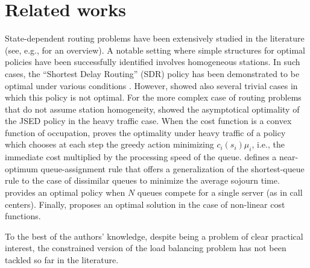 \section{Related works}
\label{sec:related works}

State-dependent routing problems have been extensively studied in the literature (see, e.g., \cite{argon2009dynamic} for an overview). A notable setting where simple structures for optimal policies have been successfully identified involves homogeneous stations. In such cases, the ``Shortest Delay Routing'' (SDR) policy has been demonstrated to be optimal under various conditions \cite{winston1977optimality, weber1978optimal}.
However, \cite{whitt1986deciding} showed also several trivial cases in which this policy is not optimal.
For the more complex case of routing problems that do not assume station homogeneity, \cite{foschini1977heavy} showed the asymptotical optimality of the JSED policy in the heavy traffic case. When the cost function is a convex function of occupation, \cite{mandelbaum2004scheduling} proves the optimality under heavy traffic of a policy which chooses at each step the greedy action minimizing $c_i(s_i) \mu_i$, i.e., the immediate cost multiplied by the processing speed of the queue.
\cite{krishnanJoiningRightQueue1987} defines a near-optimum queue-assignment rule that offers a generalization of the shortest-queue rule to the case of dissimilar queues to minimize the average sojourn time. \cite{buyukkoc1985cmu} provides an optimal policy when $N$ queues compete for a single server (as in call centers). Finally, \cite{stolyar2005optimal} proposes an optimal solution in the case of non-linear cost functions. 
\begin{comment}
\paragraph{Queues with admission cost (pricing)}
\cite{tandra2004join}

\cite{dubeDifferentialJoinPrices2002}

\cite{bodasLoadBalancingRouting2011}

\cite{bradfordPricingRoutingIncentive1996}
    
\end{comment}
To the best of the authors' knowledge, despite being a problem of clear practical interest, the constrained version of the load balancing problem has not been tackled so far in the literature. 

